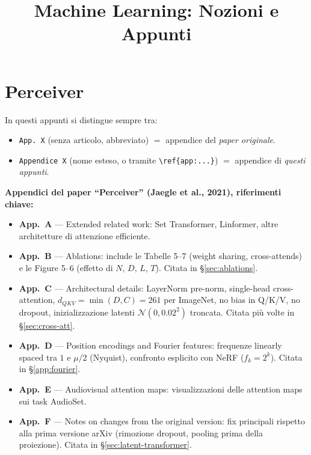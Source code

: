 \documentclass[
  11pt,
]{article}
\title{Machine Learning: Nozioni e Appunti}
\author{}
\date{}
\begin{document}
\maketitle
\tableofcontents
\clearpage

\section{Perceiver}
\label{sec:perceiver-cap}

\begin{notabox}[title={\textbf{Convenzione sulle citazioni e mappa delle appendici del paper}}]
In questi appunti si distingue sempre tra:
\begin{itemize}\setlength\itemsep{0.1em}
\item \texttt{App.\ X} (senza articolo, abbreviato) $=$ appendice del \emph{paper originale}.
\item \texttt{Appendice X} (nome esteso, o tramite \texttt{\textbackslash ref\{app:...\}}) $=$ appendice di \emph{questi appunti}.
\end{itemize}

\medskip
\textbf{Appendici del paper ``Perceiver'' (Jaegle et al., 2021), riferimenti chiave:}
\begin{itemize}\setlength\itemsep{0.1em}
\item \textbf{App.\ A} --- Extended related work: Set Transformer, Linformer, altre architetture di attenzione efficiente.
\item \textbf{App.\ B} --- Ablations: include le Tabelle 5--7 (weight sharing, cross-attends) e le Figure 5--6 (effetto di $N$, $D$, $L$, $T$). Citata in \S\ref{sec:ablations}.
\item \textbf{App.\ C} --- Architectural details: LayerNorm pre-norm, single-head cross-attention, $d_{QKV} = \min(D, C) = 261$ per ImageNet, no bias in Q/K/V, no dropout, inizializzazione latenti $\mathcal{N}(0, 0.02^2)$ troncata. Citata più volte in \S\ref{sec:cross-att}.
\item \textbf{App.\ D} --- Position encodings and Fourier features: frequenze linearly spaced tra $1$ e $\mu/2$ (Nyquist), confronto esplicito con NeRF ($f_k = 2^k$). Citata in \S\ref{app:fourier}.
\item \textbf{App.\ E} --- Audiovisual attention maps: visualizzazioni delle attention maps sui task AudioSet.
\item \textbf{App.\ F} --- Notes on changes from the original version: fix principali rispetto alla prima versione arXiv (rimozione dropout, pooling prima della proiezione). Citata in \S\ref{sec:latent-transformer}.
\end{itemize}
\end{notabox}
\end{document}
